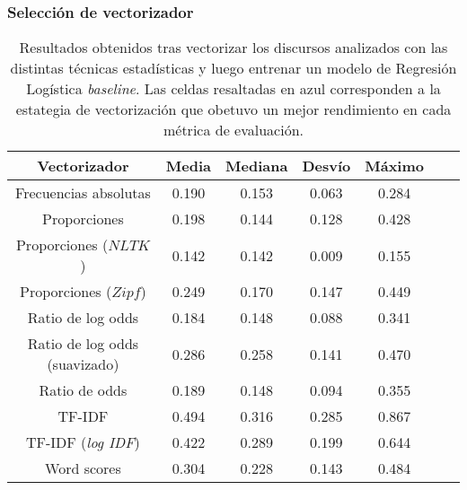 \subsubsection{Selección de vectorizador}
\label{appendix-table-vectorizers}

\begin{table}[!htb]
    \centering
    \begin{tabular}{ |c|c|c|c|c|c|c| }
    \hline
    Vectorizador & Media & Mediana & Desvío & Máximo \\
    \hline\hline
    Frecuencias absolutas & 0.190 & 0.153 & 0.063 & 0.284 \\
    \hline
    Proporciones & 0.198 & 0.144 & 0.128 & 0.428 \\
    \hline
    Proporciones ($NLTK$) & \cellcolor{highlight-blue!60}0.142 & \cellcolor{highlight-blue!60}0.142 & \cellcolor{highlight-blue!60}0.009 & \cellcolor{highlight-blue!60}0.155 \\
    \hline
    Proporciones ($Zipf$) & 0.249 & 0.170 & 0.147 & 0.449 \\
    \hline
    Ratio de log odds & 0.184 & 0.148 & 0.088 & 0.341 \\
    \hline
    Ratio de log odds (suavizado) & 0.286 & 0.258 & 0.141 & 0.470 \\
    \hline
    Ratio de odds & 0.189 & 0.148 & 0.094 & 0.355 \\
    \hline
    TF-IDF & \cellcolor{highlight-orange!60}0.494 & \cellcolor{highlight-orange!60}0.316 & \cellcolor{highlight-orange!60}0.285 & \cellcolor{highlight-orange!60}0.867 \\
    \hline
    TF-IDF (\textit{log IDF}) & 0.422 & 0.289 & 0.199 & 0.644 \\
    \hline
    Word scores & 0.304 & 0.228 & 0.143 & 0.484 \\
    \hline
\end{tabular}
\caption{Resultados obtenidos tras vectorizar los discursos analizados
con las distintas técnicas estadísticas y luego entrenar un modelo de
Regresión Logística \textit{baseline}. Las celdas resaltadas en azul corresponden
a la estategia de vectorización que obetuvo un mejor rendimiento en cada
métrica de evaluación.}
\label{table-appendix-fit-time}
\end{table}
\FloatBarrier


   